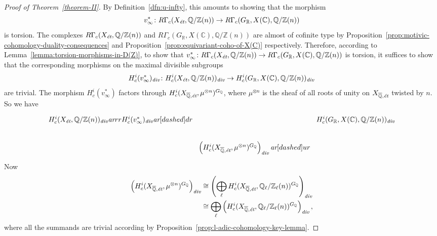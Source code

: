 \documentclass[leqno,12pt]{article}
\theoremstyle{plain}
\theoremstyle{definition}
\newcommand{\CC}{\mathbb{C}}
\newcommand{\QQ}{\mathbb{Q}}
\newcommand{\RR}{\mathbb{R}}
\newcommand{\ZZ}{\mathbb{Z}}
\renewcommand{\div}{\text{\it div}}
\newcommand{\ar}{\text{\it ar}}
\newcommand{\et}{\text{\it \'{e}t}}
\begin{document}
\begin{proof}[Proof of Theorem~\ref{theorem-II}]
  By Definition~\ref{dfn:u-infty}, this amounts to showing that the morphism
  $$v_\infty^*\colon R\Gamma_c (X_\et, \QQ/\ZZ (n)) \to R\Gamma_c (G_\RR, X (\CC), \QQ/\ZZ (n))$$
  is torsion. The complexes $R\Gamma_c (X_\et, \QQ/\ZZ (n))$ and
  $R\Gamma_c (G_\RR, X (\CC), \QQ/\ZZ (n))$ are almost of cofinite type by
  Proposition~\ref{prop:motivic-cohomology-duality-consequences} and
  Proposition~\ref{prop:equivariant-coho-of-X(C)} respectively.
  Therefore, according to Lemma~\ref{lemma:torsion-morphisms-in-D(Z)}, to show
  that
  $v^*_\infty\colon R\Gamma_c (X_\et, \QQ/\ZZ (n)) \to R\Gamma_c (G_\RR, X (\CC), \QQ/\ZZ (n))$
  is torsion, it suffices to show that the corresponding morphisms on the
  maximal divisible subgroups
  \[ H^i_c (v^*_\infty)_\div\colon H^i_c (X_\et, \QQ/\ZZ (n))_\div \to
     H^i_c (G_\RR, X (\CC), \QQ/\ZZ (n))_\div \]
  are trivial. The morphism $H^i_c (v^*_\infty)$ factors through
  $H^i_c (X_{\overline{\QQ}, \text{\it \'{e}t}}, \mu^{\otimes n})^{G_\QQ}$, where
  $\mu^{\otimes n}$ is the sheaf of all roots of unity on
  $X_{\overline{\QQ}, \text{\it \'{e}t}}$ twisted by $n$.
  So we have
  \[ \begin{tikzcd}[column sep=0pt]
    H^i_c (X_\et, \QQ/\ZZ (n))_\div\ar{rr}{H^i_c (v^*_\infty)_\div}\ar[dashed]{dr} && H^i_c (G_\RR, X (\CC), \QQ/\ZZ (n))_\div\\
    & \left(H^i_c (X_{\overline{\QQ}, \text{\it \'{e}t}}, \mu^{\otimes n})^{G_\QQ}\right)_\div\ar[dashed]{ur}
  \end{tikzcd} \]
  Now
  \begin{align*}
    \left(H^i_c (X_{\overline{\QQ}, \text{\it \'{e}t}}, \mu^{\otimes n})^{G_\QQ}\right)_\div & \cong
                                                                                               \left(\bigoplus_\ell H^i_c (X_{\overline{\QQ}, \text{\it \'{e}t}}, \QQ_\ell/\ZZ_\ell (n))^{G_\QQ}\right)_\div \\
                                                                                             & \cong
                                                                                               \bigoplus_\ell \left(H^i_c (X_{\overline{\QQ}, \text{\it \'{e}t}}, \QQ_\ell/\ZZ_\ell (n))^{G_\QQ}\right)_\div,
  \end{align*}
  where all the summands are trivial according by
  Proposition~\ref{prop:l-adic-cohomology-key-lemma}.
\end{proof}
\end{document}
